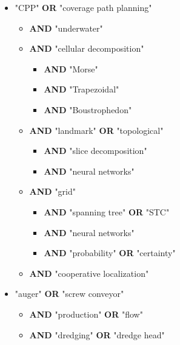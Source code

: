 \begin{itemize}
	\item "CPP" {\sffamily\bfseries{\sffamily\bfseries\textcolor{RoyalRed}{OR}}} "coverage path planning"
	\begin{itemize}
		\item {\sffamily\bfseries\textcolor{RoyalRed}{AND}} "underwater"
		\item {\sffamily\bfseries\textcolor{RoyalRed}{AND}} "cellular decomposition"
		\begin{itemize}
			\item {\sffamily\bfseries\textcolor{RoyalRed}{AND}} "Morse"
			\item {\sffamily\bfseries\textcolor{RoyalRed}{AND}} "Trapezoidal"
			\item {\sffamily\bfseries\textcolor{RoyalRed}{AND}} "Boustrophedon"
		\end{itemize}
		\item {\sffamily\bfseries\textcolor{RoyalRed}{AND}} "landmark" {\sffamily\bfseries\textcolor{RoyalRed}{OR}} "topological"
		\begin{itemize}
			\item {\sffamily\bfseries\textcolor{RoyalRed}{AND}} "slice decomposition"
			\item {\sffamily\bfseries\textcolor{RoyalRed}{AND}} "neural networks"
		\end{itemize}
		\item {\sffamily\bfseries\textcolor{RoyalRed}{AND}} "grid"
		\begin{itemize}
			\item {\sffamily\bfseries\textcolor{RoyalRed}{AND}} "spanning tree" {\sffamily\bfseries\textcolor{RoyalRed}{OR}} "STC"
			\item {\sffamily\bfseries\textcolor{RoyalRed}{AND}} "neural networks"
			\item {\sffamily\bfseries\textcolor{RoyalRed}{AND}} "probability" {\sffamily\bfseries\textcolor{RoyalRed}{OR}} "certainty"
		\end{itemize}
		\item {\sffamily\bfseries\textcolor{RoyalRed}{AND}} "cooperative localization"
	\end{itemize}
	\item "auger" {\sffamily\bfseries\textcolor{RoyalRed}{OR}} "screw conveyor"
	\begin{itemize}
		\item {\sffamily\bfseries\textcolor{RoyalRed}{AND}} "production" {\sffamily\bfseries\textcolor{RoyalRed}{OR}} "flow"
		\item {\sffamily\bfseries\textcolor{RoyalRed}{AND}} "dredging" {\sffamily\bfseries\textcolor{RoyalRed}{OR}} "dredge head"

\end{itemize}
\end{itemize}
